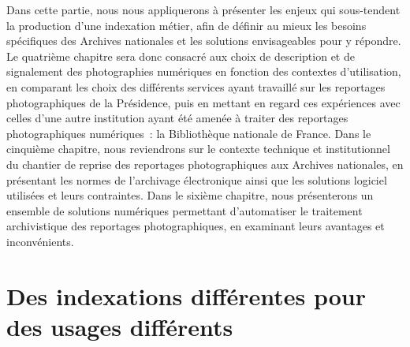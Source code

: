 Dans cette partie, nous nous appliquerons à présenter les enjeux qui sous-tendent la production d’une indexation métier, afin de définir au mieux les besoins spécifiques des Archives nationales et les solutions envisageables pour y répondre.  Le quatrième chapitre sera donc consacré aux choix de description et de signalement des photographies numériques en fonction des contextes d’utilisation, en comparant les choix des différents services ayant travaillé sur les reportages photographiques de la Présidence, puis en mettant en regard ces expériences avec celles d’une autre institution ayant été amenée à traiter des reportages photographiques numériques : la Bibliothèque nationale de France. Dans le cinquième chapitre, nous reviendrons sur le contexte technique et institutionnel du chantier de reprise des reportages photographiques aux Archives nationales, en présentant les normes de l’archivage électronique ainsi que les solutions logiciel utilisées et leurs contraintes. Dans le sixième chapitre, nous présenterons un ensemble de solutions numériques permettant d’automatiser le traitement archivistique des reportages photographiques, en examinant leurs avantages et inconvénients.

\chapter{Des indexations différentes pour des usages différents}

